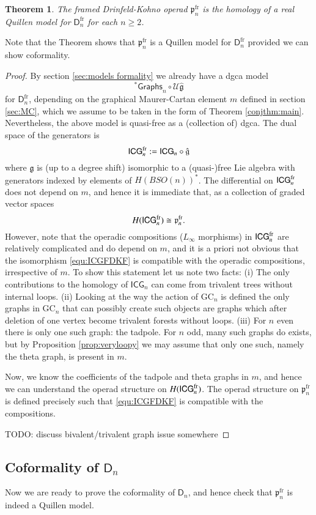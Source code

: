 \documentclass[a4paper]{amsart}
\theoremstyle{plain}
\newtheorem{thm}{Theorem}
\theoremstyle{definition}
\newcommand{\alg}[1]{\mathfrak{{#1}}}
\newcommand{\Graphs}{{\mathsf{Graphs}}}
\newcommand{\ICG}{\mathsf{ICG}}
\newcommand{\ICGF}{\ICG^{\rm fr}}
\newcommand{\FICG}{\ICGF}
\newcommand{\GC}{\mathrm{GC}}
\newcommand{\mU}{\mathcal{U}}
\newcommand{\stG}{{}^*\Graphs}
\newcommand{\SO}{\mathit{SO}}
\newcommand{\lD}{\mathsf{D}}
\newcommand{\flD}{\lD^{\mathrm{fr}}}
\newcommand{\DK}{{\alg p}}
\newcommand{\DKF}{\DK^{\mathrm{fr}}}
\begin{document}
\begin{thm}\label{thm:homFICG}
The framed Drinfeld-Kohno operad $\DKF_n$ is the homology of a real Quillen model for $\flD_n$ for each $n\geq 2$.
\end{thm}
Note that the Theorem shows that $\DKF_n$ is a Quillen model for $\flD_n$ provided we can show coformality.
\begin{proof}
By section \ref{sec:models formality} we already have a dgca model 
\[
\stG_n \circ \mU\hat{\alg g}
\]
for $\flD_n$, depending on the graphical Maurer-Cartan element $m$ defined in section \ref{sec:MC}, which we assume to be taken in the form of Theorem \ref{conjthm:main}. 
Nevertheless, the above model is quasi-free as a (collection of) dgca. The dual space of the generators is 
\[
\FICG_n:= \ICG_n \circ \hat{\alg g}
\]
where $\hat{\alg g}$ is (up to a degree shift) isomorphic to a (quasi-)free Lie algebra with generators indexed by elements of $H(B\SO(n))^*$.
The differential on $\FICG_n$ does not depend on $m$, and hence it is immediate that, as a collection of graded vector spaces
\begin{equation}\label{equ:ICGFDKF}
H(\ICGF_n) \cong \DKF_n.
\end{equation}
However, note that the operadic compositions ($L_\infty$ morphisms) in $\FICG_n$ are relatively complicated and do depend on $m$, and it is a priori not obvious that the isomorphism \eqref{equ:ICGFDKF} is compatible with the operadic compositions, irrespective of $m$.
To show this statement let us note two facts: (i) The only contributions to the homology of $\ICG_n$ can come from trivalent trees without internal loops. (ii) Looking at the way the action of $\GC_n$ is defined the only graphs in $\GC_n$ that can possibly create such objects are graphs which after deletion of one vertex become trivalent forests without loops.
(iii) For $n$ even there is only one such graph: the tadpole. For $n$ odd, many such graphs do exists, but by Proposition \ref{prop:veryloopy} we may assume that only one such, namely the theta graph, is present in $m$. 

Now, we know the coefficients of the tadpole and theta graphs in $m$, and hence we can understand the operad structure on $H(\ICGF_n)$. The operad structure on $\DKF_n$ is defined precisely such that \eqref{equ:ICGFDKF} is compatible with the compositions.

TODO: discuss bivalent/trivalent graph issue somewhere
\end{proof}


\subsection{ Coformality of \texorpdfstring{$\lD_n$}{Dn}}
Now we are ready to prove the coformality of $\lD_n$, and hence check that $\DKF_n$ is indeed a Quillen model.
\end{document}
